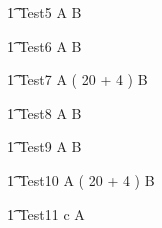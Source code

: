 
\begin{circusaction}
   \t1 Test5 \circdef  A \circtimeout B  \\
\end{circusaction}


\begin{circusaction}
   \t1 Test6 \circdef  A  B  \\
\end{circusaction}


\begin{circusaction}
   \t1 Test7 \circdef  A \circtimeout  ( 20 + 4 ) B  \\
\end{circusaction}




\begin{circusaction}
   \t1 Test8 \circdef  A \circtimedinterrupt B  \\
\end{circusaction}


\begin{circusaction}
   \t1 Test9 \circdef  A  B  \\
\end{circusaction}

\begin{circusaction}
   \t1 Test10 \circdef  A \circtimedinterrupt  ( 20 + 4 ) B  \\
\end{circusaction}


\begin{circusaction}
   \t1 Test11 \circdef c  A \\
\end{circusaction}

